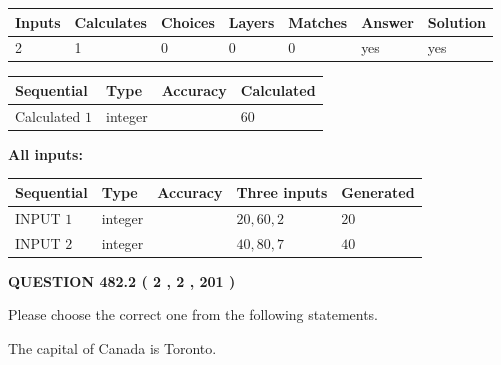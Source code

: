 \documentclass[12pt]{article}
\begin{document}
 

 
   
   
   
   
\noindent\begin{tabular}{|l|l|l|l|l|l|l|}
 \hline
Inputs & Calculates & Choices & Layers & Matches & Answer & Solution \\ \hline
 2  & 
 1  & 
 0
  & 
 0  & 
 0  & 
  yes & 
  yes 
  \\ \hline
 \end{tabular}
   
   
   
   
\noindent{}
   
   
  
  
\noindent\begin{tabular}{|l|l|l|l|}
\hline
 Sequential & Type & Accuracy & Calculated \\ 
\hline
 
 
  Calculated $  1 $ & integer &  & 
  $ 60 $ 
 \\  \hline  
 \end{tabular}
   
   
   
   
\noindent\vspace{0.1in}\hspace{-0.08in} {\textbf{\Large{All inputs: }}}
   
   
  
  
\noindent\begin{tabular}{|l|l|l|l|l|}
\hline
 Sequential & Type & Accuracy & Three inputs & Generated \\ 
\hline
 
 
  INPUT $  1 $ & integer &  & $
 20
 , 
 60
 , 
 2
 $ & $ 20 $ 
 \\  \hline  
 
 
  INPUT $  2 $ & integer &  & $
 40
 , 
 80
 , 
 7
 $ & $ 40 $ 
 \\  \hline  
 \end{tabular}
   
   
  
\vspace{0.2in}
  
{\textbf{\Large{QUESTION
482.2 
 ( 2 , 2 , 201 )
}}}
  
  
Please choose the correct one from the following statements.
 
 
The capital of Canada is Toronto.
 
\end{document}
